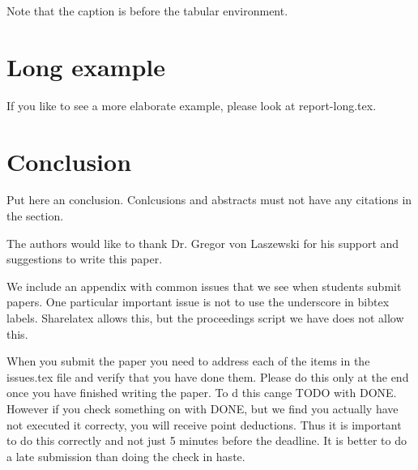 \documentclass[sigconf]{acmart}
\begin{document}
Note that the caption is before the tabular environment.


\section{Long example}

If you like to see a more elaborate example, please look at
report-long.tex. 

\section{Conclusion}

Put here an conclusion. Conlcusions and abstracts must not have any
citations in the section.


\begin{acks}

  The authors would like to thank Dr. Gregor von Laszewski for his
  support and suggestions to write this paper.

\end{acks}


 

\appendix

We include an appendix with common issues that we see when students
submit papers. One particular important issue is not to use the
underscore in bibtex labels. Sharelatex allows this, but the
proceedings script we have does not allow this.

When you submit the paper you need to address each of the items in the
issues.tex file and verify that you have done them. Please do this
only at the end once you have finished writing the paper. To d this
cange TODO with DONE. However if you check something on with DONE, but
we find you actually have not executed it correcty, you will receive
point deductions. Thus it is important to do this correctly and not
just 5 minutes before the deadline. It is better to do a late
submission than doing the check in haste. 

%
\end{document}
